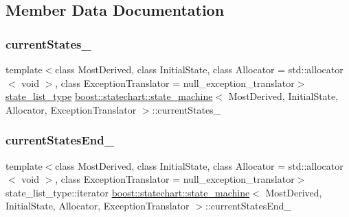\subsection{Member Data Documentation}
\mbox{\label{classboost_1_1statechart_1_1state__machine_a9deab0444eeb25aeb8451bd6a62ec645}} 
\subsubsection{\texorpdfstring{current\+States\+\_\+}{currentStates\_}}
{\footnotesize\ttfamily template$<$class Most\+Derived, class Initial\+State, class Allocator = std\+::allocator$<$ void $>$, class Exception\+Translator = null\+\_\+exception\+\_\+translator$>$ \\
\mbox{\hyperlink{classboost_1_1statechart_1_1state__machine_afe501a67ddcd1da38728f6c672b57198}{state\+\_\+list\+\_\+type}} \mbox{\hyperlink{classboost_1_1statechart_1_1state__machine}{boost\+::statechart\+::state\+\_\+machine}}$<$ Most\+Derived, Initial\+State, Allocator, Exception\+Translator $>$\+::current\+States\+\_\+\hspace{0.3cm}{\ttfamily [private]}}

\mbox{\label{classboost_1_1statechart_1_1state__machine_af4f0ac6b55e17e5f88e6bd7177ee6175}} 
\subsubsection{\texorpdfstring{current\+States\+End\+\_\+}{currentStatesEnd\_}}
{\footnotesize\ttfamily template$<$class Most\+Derived, class Initial\+State, class Allocator = std\+::allocator$<$ void $>$, class Exception\+Translator = null\+\_\+exception\+\_\+translator$>$ \\
state\+\_\+list\+\_\+type\+::iterator \mbox{\hyperlink{classboost_1_1statechart_1_1state__machine}{boost\+::statechart\+::state\+\_\+machine}}$<$ Most\+Derived, Initial\+State, Allocator, Exception\+Translator $>$\+::current\+States\+End\+\_\+\hspace{0.3cm}{\ttfamily [private]}}


